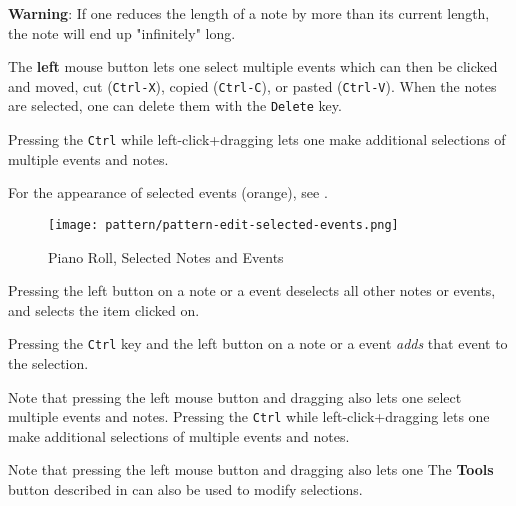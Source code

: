    \textbf{Warning}:  If one reduces the length of a note by more than its
   current length, the note will end up "infinitely" long.

	The \textbf{left} mouse button lets one select multiple events 
   which can then be clicked and moved,
    cut (\texttt{Ctrl-X}), 
    copied (\texttt{Ctrl-C}),
    or pasted (\texttt{Ctrl-V}).
   When the notes are selected,
   one can delete them with the \texttt{Delete} key.

   Pressing the \texttt{Ctrl} while left-click+dragging lets one
   make additional selections of multiple events and notes.

   For the appearance of selected events (orange), see
   .

\begin{figure}[H]
   \centering 
   \texttt{[image: pattern/pattern-edit-selected-events.png]}
   \caption{Piano Roll, Selected Notes and Events}
   \label{fig:pattern_editor_selected_events}
\end{figure}

   Pressing the left button on a note or a event deselects all other notes
   or events, and selects the item clicked on.

   Pressing the \texttt{Ctrl} key and the left button on a note or a event
   \textsl{adds} that event to the selection.

   Note that pressing the left mouse button and dragging also lets one
   select multiple events and notes.
   Pressing the \texttt{Ctrl} while left-click+dragging lets one
   make additional selections of multiple events and notes.

   Note that pressing the left mouse button and dragging also lets one
   The \textbf{Tools} button described in
    can also be used to
   modify selections.

